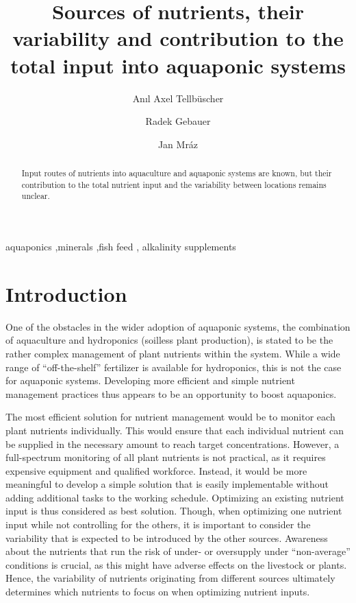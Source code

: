 \documentclass[preprint, 3p,
authoryear]{elsarticle} %
\begin{document}
\begin{frontmatter}

  \title{Sources of nutrients, their variability and contribution to the
total input into aquaponic systems}
    \author[USB]{Anıl Axel Tellbüscher%
  }
    \author[USB]{Radek Gebauer%
  }
    \author[USB]{Jan Mráz%
  }
      \affiliation[USB]{}
  
  \begin{abstract}
  Input routes of nutrients into aquaculture and aquaponic systems are
  known, but their contribution to the total nutrient input and the
  variability between locations remains unclear.
  \end{abstract}
    \begin{keyword}
    aquaponics \sep minerals \sep fish feed \sep 
    alkalinity supplements
  \end{keyword}
  
 \end{frontmatter}

\hypertarget{introduction}{%
\section{Introduction}\label{introduction}}

One of the obstacles in the wider adoption of aquaponic systems, the
combination of aquaculture and hydroponics (soilless plant production),
is stated to be the rather complex management of plant nutrients within
the system. While a wide range of ``off-the-shelf'' fertilizer is
available for hydroponics, this is not the case for aquaponic systems.
Developing more efficient and simple nutrient management practices thus
appears to be an opportunity to boost aquaponics.

The most efficient solution for nutrient management would be to monitor
each plant nutrients individually. This would ensure that each
individual nutrient can be supplied in the necessary amount to reach
target concentrations. However, a full-spectrum monitoring of all plant
nutrients is not practical, as it requires expensive equipment and
qualified workforce. Instead, it would be more meaningful to develop a
simple solution that is easily implementable without adding additional
tasks to the working schedule. Optimizing an existing nutrient input is
thus considered as best solution. Though, when optimizing one nutrient
input while not controlling for the others, it is important to consider
the variability that is expected to be introduced by the other sources.
Awareness about the nutrients that run the risk of under- or oversupply
under ``non-average'' conditions is crucial, as this might have adverse
effects on the livestock or plants. Hence, the variability of nutrients
originating from different sources ultimately determines which nutrients
to focus on when optimizing nutrient inputs.
\end{document}
